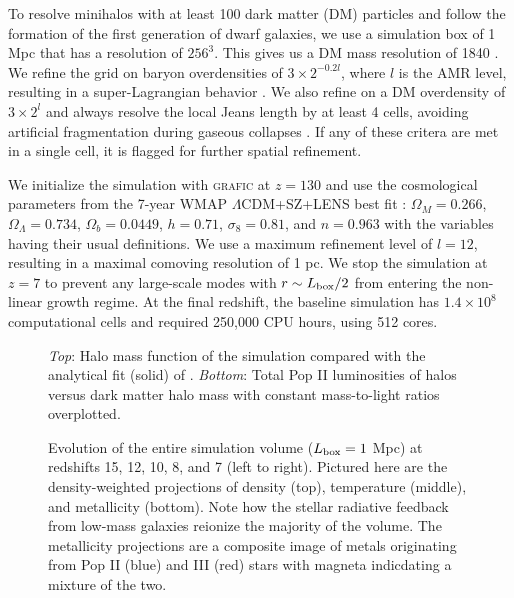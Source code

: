 \documentclass[apjl]{emulateapj}
\begin{document}
To resolve minihalos with at least 100 dark matter (DM) particles and
follow the formation of the first generation of dwarf galaxies, we use
a simulation box of 1 Mpc that has a resolution of $256^3$.  This
gives us a DM mass resolution of 1840 \Ms.  We refine the grid on
baryon overdensities of $3 \times 2^{-0.2l}$, where $l$ is the AMR
level, resulting in a super-Lagrangian behavior \citep[also
  see][]{OShea08}.  We also refine on a DM overdensity of $3 \times
2^l$ and always resolve the local Jeans length by at least 4 cells,
avoiding artificial fragmentation during gaseous collapses
\citep{Truelove97}.  If any of these critera are met in a single cell,
it is flagged for further spatial refinement.  

We initialize the simulation with \textsc{grafic}
\citep{Bertschinger01} at $z = 130$ and use the cosmological
parameters from the 7-year WMAP $\Lambda$CDM+SZ+LENS best fit
\citep{WMAP7}: $\Omega_M = 0.266$, $\Omega_\Lambda = 0.734$, $\Omega_b
= 0.0449$, $h = 0.71$, $\sigma_8 = 0.81$, and $n = 0.963$ with the
variables having their usual definitions.  We use a maximum refinement
level of $l = 12$, resulting in a maximal comoving resolution of 1 pc.
We stop the simulation at $z=7$ to prevent any large-scale modes with
$r \sim L_{\rm box}/2$ from entering the non-linear growth regime.  At
the final redshift, the baseline simulation has $1.4 \times 10^8$
computational cells and required 250,000 CPU hours, using 512 cores.


\begin{figure}
\caption{\label{fig:massfn} \textit{Top}: Halo mass function of the
  simulation compared with the analytical fit (solid) of
  \citet{Warren06}.  \textit{Bottom}: Total Pop II luminosities of
  halos versus dark matter halo mass with constant mass-to-light
  ratios overplotted.}
\end{figure}




\begin{figure*}
  \caption{\label{fig:evo-mosaic} Evolution of the entire simulation
    volume ($L_{\rm box} = 1$ Mpc) at redshifts 15, 12, 10, 8, and 7
    (left to right).  Pictured here are the density-weighted
    projections of density (top), temperature (middle), and
    metallicity (bottom).  Note how the stellar radiative feedback
    from low-mass galaxies reionize the majority of the volume.  The
    metallicity projections are a composite image of metals
    originating from Pop II (blue) and III (red) stars with magneta
    indicdating a mixture of the two.}
\end{figure*}
\end{document}
